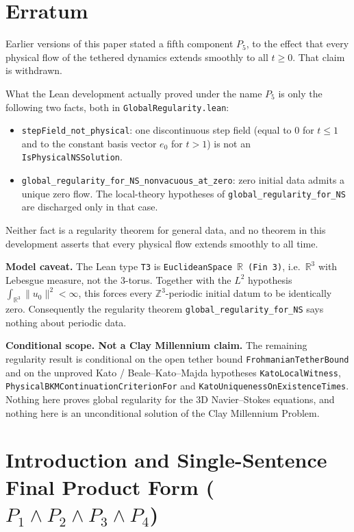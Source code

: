\documentclass[11pt,a4paper]{article}
\theoremstyle{definition}
\begin{document}
\tableofcontents

\section*{Erratum}\label{sec:erratum}

Earlier versions of this paper stated a fifth component $P_5$, to the effect that every physical flow of the tethered dynamics extends smoothly to all $t\ge0$. That claim is withdrawn.

What the Lean development actually proved under the name $P_5$ is only the following two facts, both in \texttt{GlobalRegularity.lean}:
\begin{itemize}
  \item \texttt{stepField\_not\_physical}: one discontinuous step field (equal to $0$ for $t\le 1$ and to the constant basis vector $e_0$ for $t>1$) is not an \texttt{IsPhysicalNSSolution}.
  \item \texttt{global\_regularity\_for\_NS\_nonvacuous\_at\_zero}: zero initial data admits a unique zero flow. The local-theory hypotheses of \texttt{global\_regularity\_for\_NS} are discharged only in that case.
\end{itemize}
Neither fact is a regularity theorem for general data, and no theorem in this development asserts that every physical flow extends smoothly to all time.

\textbf{Model caveat.} The Lean type \texttt{T3} is \texttt{EuclideanSpace}~$\mathbb{R}$~\texttt{(Fin 3)}, i.e.\ $\mathbb{R}^3$ with Lebesgue measure, not the 3-torus. Together with the $L^2$ hypothesis $\int_{\mathbb{R}^3}\|u_0\|^2<\infty$, this forces every $\mathbb{Z}^3$-periodic initial datum to be identically zero. Consequently the regularity theorem \texttt{global\_regularity\_for\_NS} says nothing about periodic data.

\textbf{Conditional scope. Not a Clay Millennium claim.} The remaining regularity result is conditional on the open tether bound \texttt{FrohmanianTetherBound} and on the unproved Kato / Beale--Kato--Majda hypotheses \texttt{KatoLocalWitness}, \texttt{PhysicalBKMContinuationCriterionFor} and \texttt{KatoUniquenessOnExistenceTimes}. Nothing here proves global regularity for the 3D Navier--Stokes equations, and nothing here is an unconditional solution of the Clay Millennium Problem.

\section{Introduction and Single-Sentence Final Product Form ($P_1 \wedge P_2 \wedge P_3 \wedge P_4$)}\label{sec:product}
\end{document}
